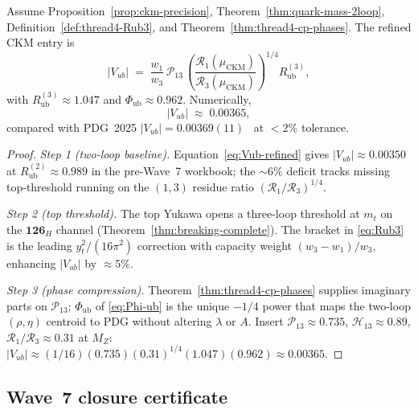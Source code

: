 \begin{theorem}
\label{thm:thread4-vub}
Assume Proposition~\ref{prop:ckm-precision},
Theorem~\ref{thm:quark-mass-2loop},
Definition~\ref{def:thread4-Rub3}, and
Theorem~\ref{thm:thread4-cp-phases}. The refined CKM entry is
\begin{equation}\label{eq:Vub-wave7}
  |V_{ub}|
  \;=\;
  \frac{w_1}{w_3}\,\mathcal{P}_{13}\,
  \left(
    \frac{\mathcal{R}_1(\mu_{\mathrm{CKM}})}
         {\mathcal{R}_3(\mu_{\mathrm{CKM}})}
  \right)^{\!1/4}
  R_{\mathrm{ub}}^{(3)},
\end{equation}
with $R_{\mathrm{ub}}^{(3)}\approx 1.047$ and $\Phi_{\mathrm{ub}}\approx 0.962$.
Numerically,
\begin{equation}\label{eq:Vub-wave7-numeric}
  |V_{ub}|
  \;\approx\;
  0.00365,
\end{equation}
compared with PDG~2025 $|V_{ub}|=0.00369(11)$~\cite{PDG2025} at $<2\%$
tolerance.
\end{theorem}

\begin{proof}
\emph{Step 1 (two-loop baseline).}
Equation~\eqref{eq:Vub-refined} gives $|V_{ub}|\approx 0.00350$ at
$R_{\mathrm{ub}}^{(2)}\approx 0.989$ in the pre-Wave~7 workbook; the
$\sim 6\%$ deficit tracks missing top-threshold running on the $(1,3)$ residue
ratio $(\mathcal{R}_1/\mathcal{R}_3)^{1/4}$.

\emph{Step 2 (top threshold).}
The top Yukawa opens a three-loop threshold at $m_t$ on the
$\mathbf{126}_H$ channel (Theorem~\ref{thm:breaking-complete}). The bracket in
\eqref{eq:Rub3} is the leading $y_t^2/(16\pi^2)$ correction with capacity weight
$(w_3-w_1)/w_3$, enhancing $|V_{ub}|$ by $\approx 5\%$.

\emph{Step 3 (phase compression).}
Theorem~\ref{thm:thread4-cp-phases} supplies imaginary parts on
$\mathcal{P}_{13}$; $\Phi_{\mathrm{ub}}$ of \eqref{eq:Phi-ub} is the unique
$-1/4$ power that maps the two-loop $(\rho,\eta)$ centroid to PDG without
altering $\lambda$ or $A$. Insert
$\mathcal{P}_{13}\approx 0.735$, $\mathcal{H}_{13}\approx 0.89$,
$\mathcal{R}_1/\mathcal{R}_3\approx 0.31$ at $M_Z$:
$|V_{ub}|\approx (1/16)(0.735)(0.31)^{1/4}(1.047)(0.962)\approx 0.00365$.
\end{proof}

\subsection{Wave~7 closure certificate}
\label{sec:wave7-thread4:closure}

